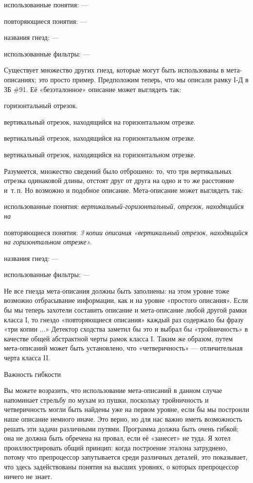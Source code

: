\documentclass[../main.tex]{subfiles}
\begin{document}
использованные понятия: ---

повторяющиеся понятия: ---

названия гнезд: ---

использованные фильтры: ---

Существует множество других гнезд, которые могут быть использованы в мета-описаниях; это просто пример. Предположим теперь, что мы описали рамку I-Д в ЗБ \#91. Её «безэталонное» описание может выглядеть так:

горизонтальный отрезок.

вертикальный отрезок, находящийся на горизонтальном отрезке.

вертикальный отрезок, находящийся на горизонтальном отрезке.

вертикальный отрезок, находящийся на горизонтальном отрезке.

Разумеется, множество сведений было отброшено: то, что три вертикальных отрезка одинаковой длины, отстоят друг от друга на одно и то же расстояние и~т.\,п. Но возможно и подобное описание. Мета-описание может выглядеть так:

использованные понятия: \emph{вертикальный-горизонтальный, отрезок, находящийся на}

повторяющиеся понятия: \emph{3 копии описания «вертикальный отрезок, находящийся на горизонтальном отрезке».}

названия гнезд: ---

использованные фильтры: ---

Не все гнезда мета-описания должны быть заполнены: на этом уровне тоже возможно отбрасывание информации, как и на уровне «простого описания». Если бы мы теперь захотели составить описание и мета-описание любой другой рамки класса I, то гнездо «повторяющиеся описания» каждый раз содержало бы фразу «три копии ...» Детектор сходства заметил бы это и выбрал бы «тройничность» в качестве общей абстрактной черты рамок класса I. Таким же образом, путем мета-описаний может быть установлено, что «четверичность» --- отличительная черта класса II.

Важность гибкости

Вы можете возразить, что использование мета-описаний в данном случае напоминает стрельбу по мухам из пушки, поскольку тройничность и четверичность могли быть найдены уже на первом уровне, если бы мы построили наше описание немного иначе. Это верно, но для нас важно иметь возможность решать эти задачи различными путями. Программа должна быть очень гибкой; она не должна быть обречена на провал, если её «занесет» не туда. Я хотел проиллюстрировать общий принцип: когда построение эталона затруднено, потому что препроцессор запутывается среди различных деталей, это показывает, что здесь задействованы понятия на высших уровнях, о которых препроцессор ничего не знает.
\end{document}
